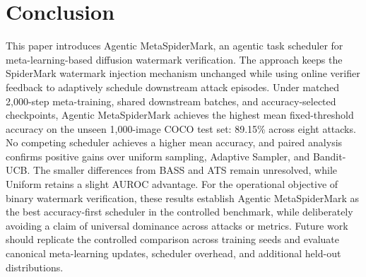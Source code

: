 \section{Conclusion}
\label{sec:conclusion}

This paper introduces Agentic MetaSpiderMark, an agentic task scheduler for meta-learning-based diffusion watermark verification.
The approach keeps the SpiderMark watermark injection mechanism unchanged while using online verifier feedback to adaptively schedule downstream attack episodes.
Under matched 2,000-step meta-training, shared downstream batches, and accuracy-selected checkpoints, Agentic MetaSpiderMark achieves the highest mean fixed-threshold accuracy on the unseen 1,000-image COCO test set: 89.15\% across eight attacks.
No competing scheduler achieves a higher mean accuracy, and paired analysis confirms positive gains over uniform sampling, Adaptive Sampler, and Bandit-UCB.
The smaller differences from BASS and ATS remain unresolved, while Uniform retains a slight AUROC advantage.
For the operational objective of binary watermark verification, these results establish Agentic MetaSpiderMark as the best accuracy-first scheduler in the controlled benchmark, while deliberately avoiding a claim of universal dominance across attacks or metrics.
Future work should replicate the controlled comparison across training seeds and evaluate canonical meta-learning updates, scheduler overhead, and additional held-out distributions.
